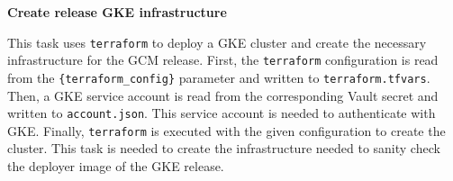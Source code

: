 \textbf{Create release GKE infrastructure}

This task uses \verb|terraform| to deploy a GKE cluster and create the necessary infrastructure for the GCM release.
First, the \verb|terraform| configuration is read from the \verb|{terraform_config}| parameter and written to \verb|terraform.tfvars|.
Then, a GKE service account is read from the corresponding Vault secret and written to \verb|account.json|.
This service account is needed to authenticate with GKE.
Finally, \verb|terraform| is executed with the given configuration to create the cluster.
This task is needed to create the infrastructure needed to sanity check the deployer image of the GKE release.
